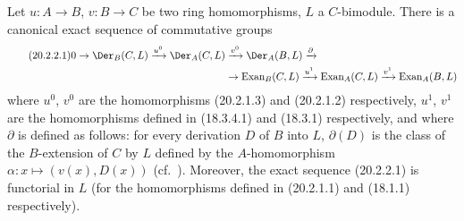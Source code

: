 \begin{theorem}[20.2.2]
\label{0.20.2.2}
Let $u:A\to B$, $v:B\to C$ be two ring homomorphisms, $L$ a $C$-bimodule.
There is a canonical exact sequence of commutative groups
\begin{align}
\tag{20.2.2.1}
  \label{0.20.2.2.1}
  0\to\Der_B(C,L)\xrightarrow{u^0}\Der_A(C,L)&\xrightarrow{v^0}\Der_A(B,L)\xrightarrow{\partial} \\
  &\to\operatorname{Exan}_B(C,L)\xrightarrow{u^1}\operatorname{Exan}_A(C,L)\xrightarrow{v^1}\operatorname{Exan}_A(B,L) \notag
\end{align}
where $u^0$, $v^0$ are the homomorphisms \textup{(}20.2.1.3\textup{)} and \textup{(}20.2.1.2\textup{)} respectively, $u^1$, $v^1$ are the homomorphisms defined in (18.3.4.1) and (18.3.1) respectively, and where $\partial$ is defined as follows: for every derivation $D$ of $B$ into $L$, $\partial(D)$ is the class of the $B$-extension of $C$ by $L$ defined by the $A$-homomorphism $\alpha:x\mapsto(v(x),D(x))$ \textup{(}cf.\ \textup{)}.
Moreover, the exact sequence \textup{(}20.2.2.1\textup{)} is functorial in $L$ \textup{(}for the homomorphisms defined in \textup{(}20.2.1.1\textup{)} and \textup{(}18.1.1\textup{)} respectively\textup{)}.
\end{theorem}

